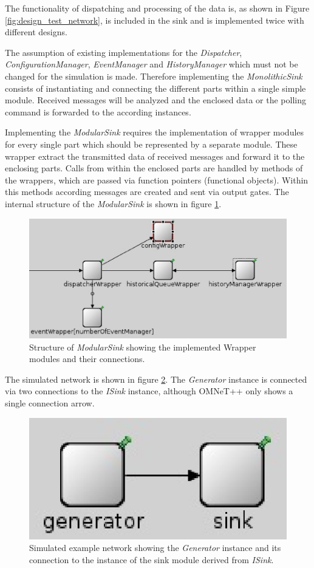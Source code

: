 The functionality of dispatching and processing of the data is, as shown in Figure \ref{fig:design_test_network}, is included in the sink and is implemented twice with different designs.

The assumption of existing implementations for the \emph{Dispatcher}, \emph{ConfigurationManager}, \emph{EventManager} and \emph{HistoryManager} which must not be changed for the simulation is made.
Therefore implementing the \emph{MonolithicSink} consists of instantiating and connecting the different parts within a single simple module.
Received messages will be analyzed and the enclosed data or the polling command is forwarded to the according instances.

Implementing the \emph{ModularSink} requires the implementation of wrapper modules for every single part which should be represented by a separate module.
These wrapper extract the transmitted data of received messages and forward it to the enclosing parts.
Calls from within the enclosed parts are handled by methods of the wrappers, which are passed via function pointers (functional objects).
Within this methods according messages are created and sent via output gates.
The internal structure of the \emph{ModularSink} is shown in figure \ref{fig:ModularSink}.

\begin{figure}
    \centering
    \includegraphics[width=0.9\linewidth]{images/ModularSink}
    \caption{Structure of \emph{ModularSink} showing the implemented Wrapper modules and their connections.}
    \label{fig:ModularSink}
\end{figure}

The simulated network is shown in figure \ref{fig:omnet_example_network}.
The \emph{Generator} instance is connected via two connections to the \emph{ISink} instance, although OMNeT++ only shows a single connection arrow.

\begin{figure}
    \centering
    \includegraphics[width=0.3\linewidth]{images/omnet_example_network}
    \caption{Simulated example network showing the \emph{Generator} instance and its connection to the instance of the sink module derived from \emph{ISink}.}
    \label{fig:omnet_example_network}
\end{figure}

